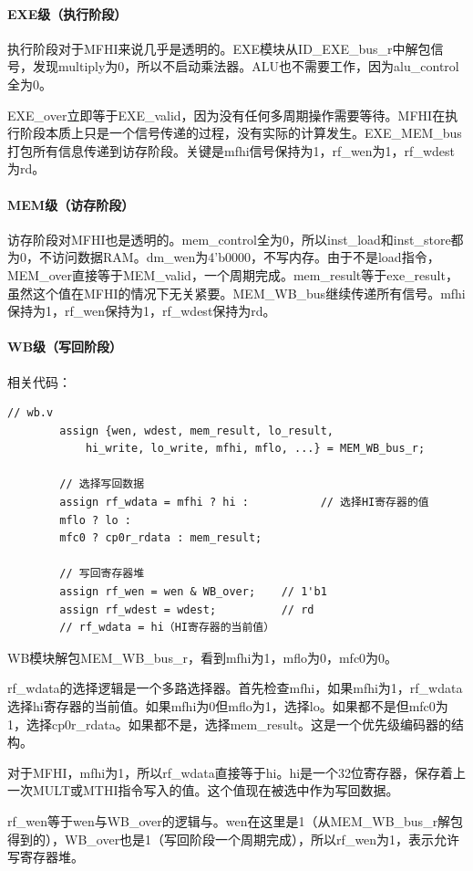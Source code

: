 \documentclass[a4paper]{article}
\begin{document}
	\paragraph{EXE级（执行阶段）}
	执行阶段对于MFHI来说几乎是透明的。EXE模块从ID\_EXE\_bus\_r中解包信号，发现multiply为0，所以不启动乘法器。ALU也不需要工作，因为alu\_control全为0。
	
	EXE\_over立即等于EXE\_valid，因为没有任何多周期操作需要等待。MFHI在执行阶段本质上只是一个信号传递的过程，没有实际的计算发生。EXE\_MEM\_bus打包所有信息传递到访存阶段。关键是mfhi信号保持为1，rf\_wen为1，rf\_wdest为rd。
	\paragraph{MEM级（访存阶段）}
	访存阶段对MFHI也是透明的。mem\_control全为0，所以inst\_load和inst\_store都为0，不访问数据RAM。dm\_wen为4'b0000，不写内存。由于不是load指令，MEM\_over直接等于MEM\_valid，一个周期完成。mem\_result等于exe\_result，虽然这个值在MFHI的情况下无关紧要。MEM\_WB\_bus继续传递所有信号。mfhi保持为1，rf\_wen保持为1，rf\_wdest保持为rd。
	\paragraph{WB级（写回阶段）}
	相关代码：
	\begin{lstlisting}[caption={WB}]
		// wb.v
		assign {wen, wdest, mem_result, lo_result,
			hi_write, lo_write, mfhi, mflo, ...} = MEM_WB_bus_r;
		
		// 选择写回数据
		assign rf_wdata = mfhi ? hi :           // 选择HI寄存器的值
		mflo ? lo : 
		mfc0 ? cp0r_rdata : mem_result;
		
		// 写回寄存器堆
		assign rf_wen = wen & WB_over;    // 1'b1
		assign rf_wdest = wdest;          // rd
		// rf_wdata = hi（HI寄存器的当前值）
	\end{lstlisting}
	
	WB模块解包MEM\_WB\_bus\_r，看到mfhi为1，mflo为0，mfc0为0。
	
	rf\_wdata的选择逻辑是一个多路选择器。首先检查mfhi，如果mfhi为1，rf\_wdata选择hi寄存器的当前值。如果mfhi为0但mflo为1，选择lo。如果都不是但mfc0为1，选择cp0r\_rdata。如果都不是，选择mem\_result。这是一个优先级编码器的结构。
	
	对于MFHI，mfhi为1，所以rf\_wdata直接等于hi。hi是一个32位寄存器，保存着上一次MULT或MTHI指令写入的值。这个值现在被选中作为写回数据。
	
	rf\_wen等于wen与WB\_over的逻辑与。wen在这里是1（从MEM\_WB\_bus\_r解包得到的），WB\_over也是1（写回阶段一个周期完成），所以rf\_wen为1，表示允许写寄存器堆。
	
\end{document}
